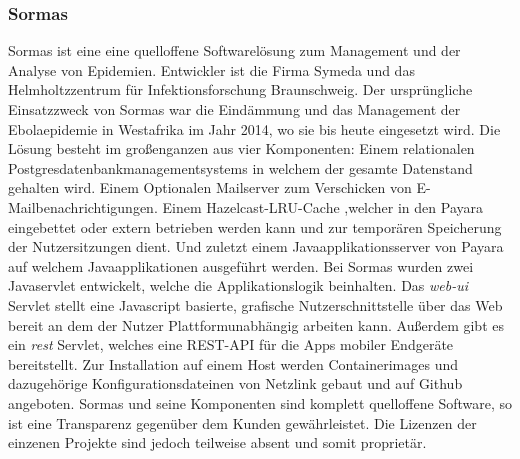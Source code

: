 \documentclass[a4paper,11pt]{article}
\begin{document}
      \subsubsection{Sormas}
      Sormas ist eine eine quelloffene Softwarelösung zum Management und der Analyse von Epidemien.
      Entwickler ist die Firma Symeda und das Helmholtzzentrum für Infektionsforschung Braunschweig.
      Der ursprüngliche Einsatzzweck von Sormas war die Eindämmung und das Management der 
      Ebolaepidemie in Westafrika im Jahr 2014, wo sie bis heute eingesetzt wird.
      \newline Die Lösung besteht im großenganzen aus vier Komponenten: Einem relationalen 
      Postgresdatenbankmanagementsystems in welchem der gesamte Datenstand gehalten wird. Einem 
      Optionalen Mailserver zum Verschicken von E-Mailbenachrichtigungen. Einem Hazelcast-LRU-Cache
      ,welcher in den Payara eingebettet oder extern betrieben werden kann und zur temporären Speicherung
      der Nutzersitzungen dient. Und zuletzt einem Javaapplikationsserver von Payara auf welchem Javaapplikationen 
      ausgeführt werden. Bei Sormas wurden zwei Javaservlet entwickelt, welche die Applikationslogik beinhalten.
      Das \textit{web-ui} Servlet stellt eine Javascript basierte, grafische Nutzerschnittstelle  über das Web 
      bereit an dem der Nutzer Plattformunabhängig arbeiten kann. Außerdem gibt es ein \textit{rest} Servlet, welches
      eine REST-API für die Apps mobiler Endgeräte bereitstellt. Zur Installation auf einem Host werden 
      Containerimages und dazugehörige Konfigurationsdateinen von Netzlink gebaut und auf Github angeboten.
      Sormas und seine Komponenten sind komplett quelloffene Software, so ist eine Transparenz gegenüber dem
      Kunden gewährleistet. Die Lizenzen der einzenen Projekte sind jedoch teilweise absent und somit proprietär.
\end{document}
